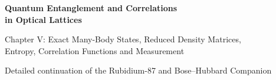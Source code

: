 \documentclass[11pt,a4paper]{article}
\begin{document}
\begin{center}
{\Large\bfseries\color{deepblue} Quantum Entanglement and Correlations\\ in Optical Lattices}\par\medskip
{\large Chapter V: Exact Many-Body States, Reduced Density Matrices,\\ Entropy, Correlation Functions and Measurement}\par\smallskip
{\small Detailed continuation of the Rubidium-87 and Bose--Hubbard Companion}\par
\end{center}
\begin{abstract}
This chapter distinguishes Bose--Einstein condensation, first-order coherence, number correlation and bipartite mode entanglement. It derives the exact two-boson/two-site ground state and reduced density matrix, diagonalizes the one-body density matrix, explains particle-number superselection, introduces spatial entanglement and mutual information, and sketches exact diagonalization on larger optical lattices. Every appearance of an ``orbital'' in the Bose--Hubbard theory means a Wannier orbital for a \emph{whole atom}, not the electronic $5s$ orbital of rubidium.
\end{abstract}
\tableofcontents
\clearpage
\end{document}
